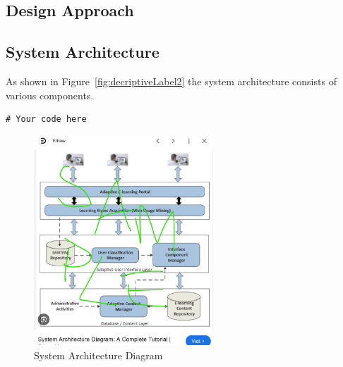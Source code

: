 \subsection{Design Approach}

\subsection{System Architecture}
As shown in Figure~\ref{fig:decriptiveLabel2} the system architecture consists of various components.

\begin{lstlisting}[style=cstyle, caption=System Architecture Code Example, label=lst:SystemArchitecture2]
# Your code here
\end{lstlisting}

\begin{figure}%
    \centering
    \includegraphics[width=0.6\textwidth]{figures/results/system_architecture.jpg}
    \caption{System Architecture Diagram}
    \label{fig:system-architecture24}
\end{figure}
